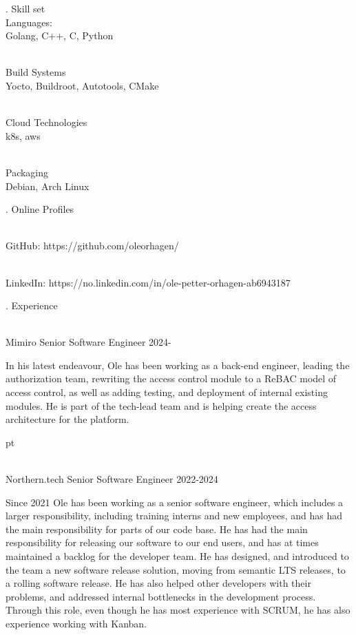 \finishpage

. {Skill set}
\\ Languages:
\\ \star Golang, C++, C, Python

\\ Build Systems
\\ \star Yocto, Buildroot, Autotools, CMake

\\ Cloud Technologies
\\ \star k8s, aws

\\ Packaging
\\ \star Debian, Arch Linux

. {Online Profiles}

\\ \star GitHub: https://github.com/oleorhagen/

\\ \star LinkedIn: https://no.linkedin.com/in/ole-petter-orhagen-ab6943187

. {Experience}


\\ \star Mimiro Senior Software Engineer 2024-

In his latest endeavour, Ole has been working as a back-end engineer, leading the
authorization team, rewriting the access control module to a ReBAC model of
access control, as well as adding testing, and deployment of internal existing
modules. He is part of the tech-lead team and is helping create the access
architecture for the platform.

 pt

\\ \star Northern.tech Senior Software Engineer 2022-2024

Since 2021 Ole has been working as a senior software engineer, which includes a
larger responsibility, including training interns and new employees, and has had
the main responsibility for parts of our code base. He has had the main
responsibility for releasing our software to our end users, and has at times
maintained a backlog for the developer team. He has designed, and introduced to
the team a new software release solution, moving from semantic LTS releases, to
a rolling software release. He has also helped other developers with their
problems, and addressed internal bottlenecks in the development process. Through
this role, even though he has most experience with SCRUM, he has also experience
working with Kanban.

